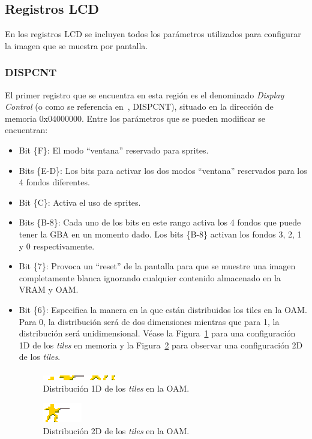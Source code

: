 \subsection{Registros LCD}\label{sec:dispcnt}
En los registros LCD se incluyen todos los parámetros utilizados para configurar la imagen que se muestra por pantalla.

\subsubsection{DISPCNT}
El primer registro que se encuentra en esta región es el denominado \textit{Display Control} (o como se referencia en~\cite{bib:gbatek}, DISPCNT), situado en la dirección de memoria 0x04000000. Entre los parámetros que se pueden modificar se encuentran:

\begin{itemize}
	\item Bit \{F\}: El modo ``ventana'' reservado para sprites.
	\item Bits \{E-D\}: Los bits para activar los dos modos ``ventana'' reservados para los 4 fondos diferentes.
	\item Bit \{C\}: Activa el uso de sprites.
	\item Bits \{B-8\}: Cada uno de los bits en este rango activa los 4 fondos que puede tener la GBA en un momento dado. Los bits \{B-8\} activan los fondos 3, 2, 1 y 0 respectivamente.
	\item Bit \{7\}: Provoca un ``reset'' de la pantalla para que se muestre una imagen completamente blanca ignorando cualquier contenido almacenado en la VRAM y OAM\@.
	\item Bit \{6\}: Especifica la manera en la que están distribuidos los tiles en la OAM\@. Para 0, la distribución será de dos dimensiones mientras que para 1, la distribución será unidimensional. Véase la Figura~\ref{fig:1d} para una configuración 1D de los \textit{tiles} en memoria y la Figura~\ref{fig:2d} para observar una configuración 2D de los \textit{tiles}.

		\begin{figure}[h]
			\centering
			\includegraphics[width=.7\textwidth]{capitulos/capitulo4/new_1d.png}
			\caption{Distribución 1D de los \textit{tiles} en la OAM.}\label{fig:1d}
		\end{figure}

		\begin{figure}[h]
			\centering
			\includegraphics[width=.4\textwidth]{capitulos/capitulo4/new_2d.png}
			\caption{Distribución 2D de los \textit{tiles} en la OAM.}\label{fig:2d}
		\end{figure}


\end{itemize}
